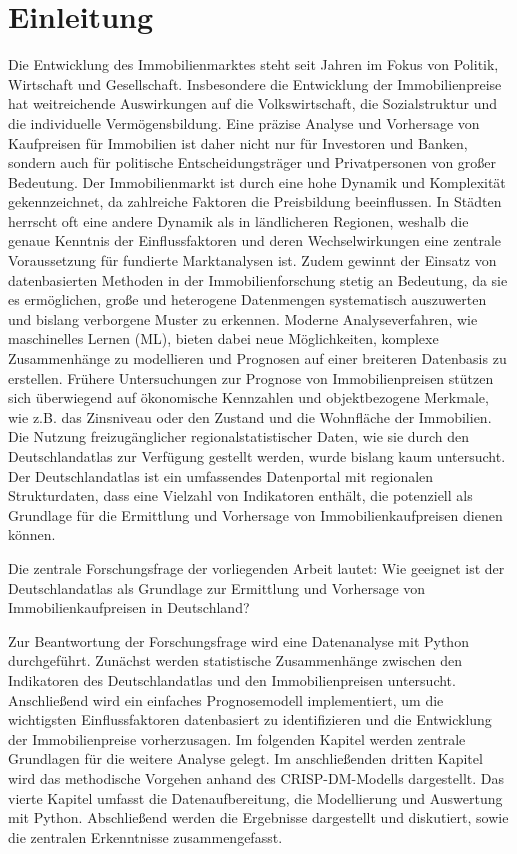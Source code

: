 \newpage

\section{Einleitung} \label{einleitung}

Die Entwicklung des Immobilienmarktes steht seit Jahren im Fokus von Politik, Wirtschaft und Gesellschaft. Insbesondere die Entwicklung der Immobilienpreise hat weitreichende Auswirkungen auf die Volkswirtschaft, die Sozialstruktur und die individuelle Vermögensbildung. Eine präzise Analyse und Vorhersage von Kaufpreisen für Immobilien ist daher nicht nur für Investoren und Banken, sondern auch für politische Entscheidungsträger und Privatpersonen von großer Bedeutung.
Der Immobilienmarkt ist durch eine hohe Dynamik und Komplexität gekennzeichnet, da zahlreiche Faktoren die Preisbildung beeinflussen. In Städten herrscht oft eine andere Dynamik als in ländlicheren Regionen, weshalb die genaue Kenntnis der Einflussfaktoren und deren Wechselwirkungen eine zentrale Voraussetzung für fundierte Marktanalysen ist. Zudem gewinnt der Einsatz von datenbasierten Methoden in der Immobilienforschung stetig an Bedeutung, da sie es ermöglichen, große und heterogene Datenmengen systematisch auszuwerten und bislang verborgene Muster zu erkennen. Moderne Analyseverfahren, wie maschinelles Lernen (ML), bieten dabei neue Möglichkeiten, komplexe Zusammenhänge zu modellieren und Prognosen auf einer breiteren Datenbasis zu erstellen.
Frühere Untersuchungen zur Prognose von Immobilienpreisen stützen sich überwiegend auf ökonomische Kennzahlen und objektbezogene Merkmale, wie z.B. das Zinsniveau oder den Zustand und die Wohnfläche der Immobilien. Die Nutzung freizugänglicher regionalstatistischer Daten, wie sie durch den Deutschlandatlas zur Verfügung gestellt werden, wurde bislang kaum untersucht. Der Deutschlandatlas ist ein umfassendes Datenportal mit regionalen Strukturdaten, dass eine Vielzahl von Indikatoren enthält, die potenziell als Grundlage für die Ermittlung und Vorhersage von Immobilienkaufpreisen dienen können.

Die zentrale Forschungsfrage der vorliegenden Arbeit lautet: 
Wie geeignet ist der Deutschlandatlas als Grundlage zur Ermittlung und Vorhersage von Immobilienkaufpreisen in Deutschland?

Zur Beantwortung der Forschungsfrage wird eine Datenanalyse mit Python durchgeführt. Zunächst werden statistische Zusammenhänge zwischen den Indikatoren des Deutschlandatlas und den Immobilienpreisen untersucht. Anschließend wird ein einfaches Prognosemodell implementiert, um die wichtigsten Einflussfaktoren datenbasiert zu identifizieren und die Entwicklung der Immobilienpreise vorherzusagen. Im folgenden Kapitel werden zentrale Grundlagen für die weitere Analyse gelegt. Im anschließenden dritten Kapitel wird das methodische Vorgehen anhand des CRISP-DM-Modells dargestellt. Das vierte Kapitel umfasst die Datenaufbereitung, die Modellierung und Auswertung mit Python. Abschließend werden die Ergebnisse dargestellt und diskutiert, sowie die zentralen Erkenntnisse zusammengefasst.